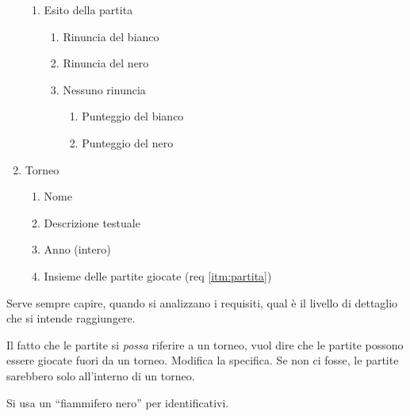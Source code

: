 \begin{enumerate}
\begin{enumerate}[label*=\arabic*.]
        \item Esito della partita
        \begin{enumerate}[label*=\arabic*.]
            \item Rinuncia del bianco
            \item Rinuncia del nero
            \item Nessuno rinuncia
            \begin{enumerate}[label*=\arabic*.]
                \item Punteggio del bianco
                \item Punteggio del nero
            \end{enumerate}
        \end{enumerate}
    \end{enumerate}
    \item Torneo
    \begin{enumerate}[label*=\arabic*.]
        \item Nome
        \item Descrizione testuale
        \item Anno (intero)
        \item Insieme delle partite giocate (req \ref{itm:partita})
    \end{enumerate}
\end{enumerate}
Serve sempre capire, quando si analizzano i requisiti, qual \`e il livello di dettaglio che si intende raggiungere.

Il fatto che le partite si \emph{possa} riferire a un torneo, vuol dire che le partite possono essere giocate fuori da un torneo. Modifica la specifica. Se non ci fosse, le partite sarebbero solo all'interno di un torneo.

\begin{figure}[h]
\centerin
{}
\end{figure}

Si usa un ``fiammifero nero'' per identificativi.

